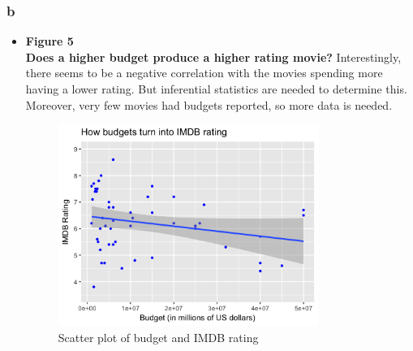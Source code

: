 \documentclass[a4paper]{article}
\begin{document}
	
	
	\subsubsection{b}
	
	\begin{itemize}
		\item \textbf{Figure 5}\\
		\textbf{Does a higher budget produce a higher rating movie?}
		Interestingly, there seems to be a negative correlation with the movies spending more having a lower rating. But inferential statistics are needed to determine this. Moreover, very few movies had budgets reported, so more data is needed. 
		\begin{figure}[h]
		\begin{center}
		\includegraphics[width=0.8\textwidth]{fig_5_scatterplot_budget_rating}
		\caption{Scatter plot of budget and IMDB rating}
		\label{fig:f5}
		\end{center}
		\end{figure}   
		

\end{itemize}
\end{document}
